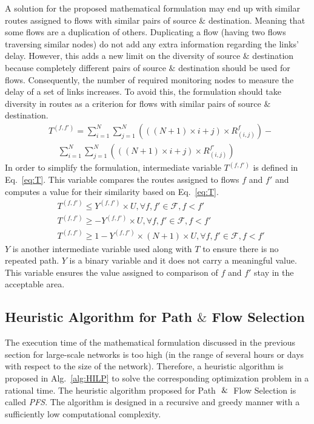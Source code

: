\documentclass[10pt, journal, letterpaper]{IEEEtran}
\begin{document}
A solution for the proposed mathematical formulation may end up with similar routes assigned to flows with similar pairs of source $\&$ destination. Meaning that some flows are a duplication of others. Duplicating a flow (having two flows traversing similar nodes) do not add any extra information regarding the links' delay. However, this adds a new limit on the diversity of source $\&$ destination because completely different pairs of source $\&$ destination should be used for flows. Consequently, the number of required monitoring nodes to measure the delay of a set of links increases. To avoid this, the formulation should take diversity in routes as a criterion for flows with similar pairs of source $\&$ destination.
\begin{align}\label{eq:T}
    & T^{(f,f')} = \sum_{i=1}^N{\sum_{j=1}^N{\left(((N+1)\times i+j)\times R_{(i,j)}^f\right)}} - \nonumber\\ 
    &~~~~~\sum_{i=1}^N{\sum_{j=1}^N{\left(((N+1)\times i+j)\times R_{(i,j)}^{f'}\right)}}
\end{align}    
In order to simplify the formulation, intermediate variable $T^{(f,f')}$ is defined in Eq.~\ref{eq:T}. This variable compares the routes assigned to flows $f$ and $f'$ and computes a value for their similarity based on Eq.~\ref{eq:T}. 
\begin{align}
    & T^{(f,f')} \leq  Y^{(f,f')}\times U, \forall f,f'\in \mathcal{F}, f<f'\\
    & T^{(f,f')} \geq  -Y^{(f,f')}\times U, \forall f,f'\in \mathcal{F}, f<f'\\
    & T^{(f,f')} \geq 1- Y^{(f,f')}\times (N+1)\times U, \forall f,f'\in \mathcal{F}, f<f'
\end{align}
$Y$ is another intermediate variable used along with $T$ to ensure there is no repeated path. $Y$ is a binary variable and it does not carry a meaningful value. This variable ensures the value assigned to comparison of $f$ and $f'$ stay in the acceptable area.

\subsection{Heuristic Algorithm for Path $\&$ Flow Selection}\label{subsec:heuristic_alg}
The execution time of the mathematical formulation discussed in the previous section for large-scale networks is too high (in the range of several hours or days with respect to the size of the network). Therefore, a heuristic algorithm is proposed in Alg.~\ref{alg:HILP} to solve the corresponding optimization problem in a rational time. The heuristic algorithm proposed for Path $\And$ Flow Selection is called \textit{PFS}. The algorithm is designed in a recursive and greedy manner with a sufficiently low computational complexity.
\end{document}
